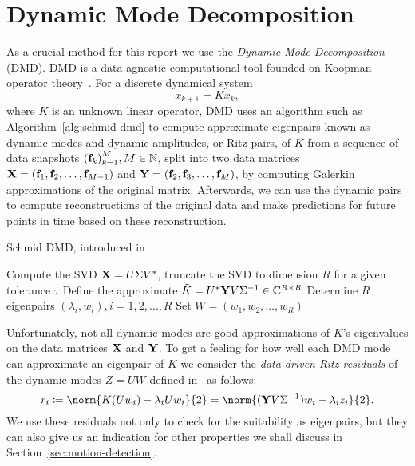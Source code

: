 \section{Dynamic Mode Decomposition}\label{sec:dmd}

As a crucial method for this report we use the \emph{Dynamic Mode Decomposition} (DMD). DMD is a data-agnostic computational tool founded on Koopman operator theory~\cite{Rowley2009, Williams2015}. For a discrete dynamical system
\begin{equation*}
    x_{k + 1} = K x_k,
\end{equation*}
where $K$ is an unknown linear operator, DMD uses an algorithm such as Algorithm~\ref{alg:schmid-dmd} to compute approximate eigenpairs known as dynamic modes and dynamic amplitudes, or Ritz pairs, of $K$ from a sequence of data snapshots ${(\mathbf{f}_k)}_{k = 1}^M, M \in \mathbb{N}$, split into two data matrices $\mathbf{X} = (\mathbf{f}_1, \mathbf{f}_2, \dots, \mathbf{f}_{M - 1})$ and $\mathbf{Y} = (\mathbf{f}_2, \mathbf{f}_3, \dots, \mathbf{f}_M)$, by computing Galerkin approximations of the original matrix. Afterwards, we can use the dynamic pairs to compute reconstructions of the original data and make predictions for future points in time based on these reconstruction.

\begin{algorithm}[!ht]
    \caption{Schmid DMD, introduced in~\cite{Schmid2010}}\label{alg:schmid-dmd}
    Compute the SVD $\mathbf{X} = U \Sigma V^*$, truncate the SVD to dimension $R$ for a given tolerance $\tau$\;
    Define the approximate $\tilde{K} = U^* \mathbf{Y} V \Sigma^{-1} \in \mathbb{C}^{R \times R}$\;
    Determine $R$ eigenpairs $(\lambda_i, w_i), i = 1, 2, \dots, R$\;
    Set $W = (w_1, w_2, \dots, w_R)$\;
\end{algorithm}

Unfortunately, not all dynamic modes are good approximations of $K$'s eigenvalues on the data matrices $\mathbf{X}$ and $\mathbf{Y}$. To get a feeling for how well each DMD mode can approximate an eigenpair of $K$ we consider the \emph{data-driven Ritz residuals} of the dynamic modes $Z = U W$ defined in~\cite{Drmac2020} as follows:
\begin{equation}\label{eq:residual}
    r_i \coloneqq \norm{K (U w_i) - \lambda_i U w_i}{2} = \norm{(\bl{Y} V \Sigma^{-1}) w_i - \lambda_i z_i}{2}.
\end{equation}
We use these residuals not only to check for the suitability as eigenpairs, but they can also give us an indication for other properties we shall discuss in Section~\ref{sec:motion-detection}.

